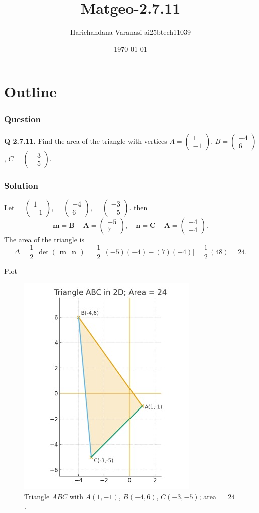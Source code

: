\documentclass{beamer}
\title{Matgeo-2.7.11}
\author{Harichandana Varanasi-ai25btech11039}
\date{\today}
\theoremstyle{remark}
\providecommand{\abs}[1]{\left\vert#1\right\vert}
\newcommand{\myvec}[1]{\ensuremath{\begin{pmatrix}#1\end{pmatrix}}}
\let\vec\mathbf
\begin{document}
\begin{frame}
\titlepage
\end{frame}

\section*{Outline}

\begin{frame}
\frametitle{Question}
\textbf{Q 2.7.11.} Find the area of the triangle with vertices
$A=\myvec{1\\-1}$,\; $B=\myvec{-4\\6}$,\; $C=\myvec{-3\\-5}$.

\end{frame}
%
\begin{frame}
\frametitle{Solution}
Let 
\vec{A} = \myvec{1\\-1},\;
\vec{B} = \myvec{-4\\6},\;
\vec{C} = \myvec{-3\\-5}.
 then
\[
\vec{m} = \vec{B} - \vec{A} = \myvec{-5\\7}, \quad
\vec{n} = \vec{C} - \vec{A} = \myvec{-4\\-4}.
\]
The area of the triangle is
\[
\Delta = \frac{1}{2}\,\abs{\det\myvec{\vec{m} & \vec{n}}}
= \frac{1}{2}\,\abs{(-5)(-4) - (7)(-4)}
= \frac{1}{2}\,(48) = \boxed{24}.
\]

\end{frame}
\begin{frame}{Plot}
     \begin{figure}[h!]
\centering
\includegraphics[width=0.5\linewidth]{figs/2.7.11.jpeg}
\caption{Triangle $ABC$ with $A(1,-1)$, $B(-4,6)$, $C(-3,-5)$; area $=24$.}


\end{figure}
\end{frame}
\end{document}

